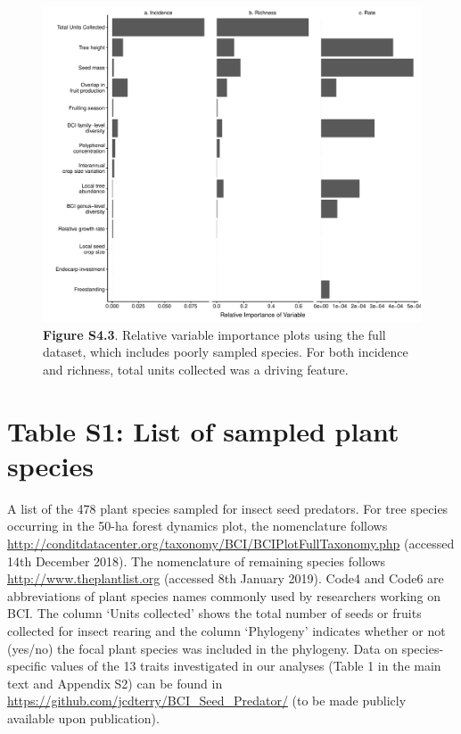 \documentclass[11pt]{article}
\begin{document}
\begin{figure}[H]
\centering\includegraphics[width=\textwidth]{../Figures/VarImpPlotsall.pdf} 
\caption[]{\textbf{Figure S4.3}. Relative variable importance plots using the full dataset, which includes poorly sampled species. For both incidence and richness, total units collected was a driving feature.  }
\end{figure}




\newpage{}



\section{Table S1: List of sampled plant species} 


A list of the 478 plant species sampled for insect seed predators. For tree species occurring in the 50-ha forest dynamics plot, the nomenclature follows \url{http://conditdatacenter.org/taxonomy/BCI/BCIPlotFullTaxonomy.php} (accessed 14th December 2018). The nomenclature of remaining species follows \url{http://www.theplantlist.org} (accessed 8th January 2019). Code4 and Code6 are abbreviations of plant species names commonly used by researchers working on BCI. The column ‘Units collected’ shows the total number of seeds or fruits collected for insect rearing and the column ‘Phylogeny’ indicates whether or not (yes/no) the focal plant species was included in the phylogeny. Data on species-specific values of the 13 traits investigated in our analyses (Table 1 in the main text and Appendix S2) can be found in \url{https://github.com/jcdterry/BCI_Seed_Predator/} (to be made publicly available upon publication).
\end{document}
